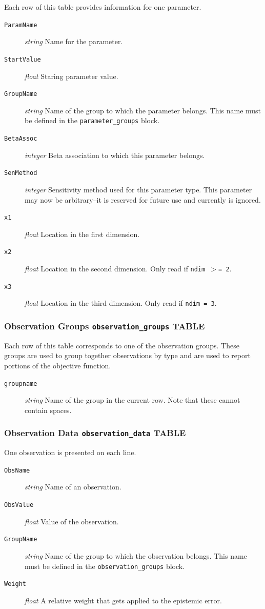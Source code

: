 \documentclass[11pt,oneside,onecolumn]{usgsreport}
\begin{document}
\begin{appendix}
\begin{bibunit}
Each row of this table provides information for one parameter.
\begin{description}
\item [{\texttt{ParamName}}] \emph{string} Name for the parameter.
\item [{\texttt{StartValue}}] \emph{float }Staring parameter value.
\item [{\texttt{GroupName}}] \emph{string} Name of the group to which the
parameter belongs. This name must be defined in the \texttt{parameter\_groups}
block.
\item [{\texttt{BetaAssoc}}] \emph{integer} Beta association to which this
parameter belongs.
\item [{\texttt{SenMethod}}] \emph{integer} Sensitivity method used for
this parameter type. This parameter may now be arbitrary--it is reserved
for future use and currently is ignored.
\item [{\texttt{x1}}] \emph{float} Location in the first dimension.
\item [{\texttt{x2}}] \emph{float} Location in the second dimension. Only
read if \texttt{ndim $>$= 2}.
\item [{\texttt{x3}}] \emph{float} Location in the third dimension. Only
read if \texttt{ndim = 3}.
\end{description}

\subsubsection{Observation Groups \texttt{observation\_groups} TABLE}

Each row of this table corresponds to one of the observation groups.
These groups are used to group together observations by type and are
used to report portions of the objective function.
\begin{description}
\item [{\texttt{groupname}}] \emph{string} Name of the group in the current
row. Note that these cannot contain spaces.
\end{description}

\subsubsection{Observation Data \texttt{observation\_data} TABLE}

One observation is presented on each line.
\begin{description}
\item [{\texttt{ObsName}}] \emph{string} Name of an observation.
\item [{\texttt{ObsValue}}] \emph{float} Value of the observation.
\item [{\texttt{GroupName}}] \emph{string} Name of the group to which the
observation belongs. This name must be defined in the \texttt{observation\_groups}
block. 
\item [{\texttt{Weight}}] \emph{float} A relative weight that gets applied
to the epistemic error.
\end{description}


\end{bibunit}
\end{appendix}
\end{document}
